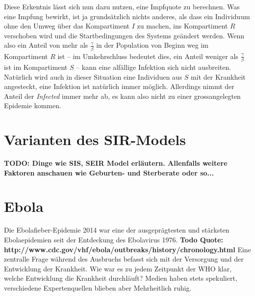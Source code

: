 \begin{refsection}
Diese Erkentnis lässt sich nun dazu nutzen, eine Impfquote zu berechnen. 
Was eine Impfung bewirkt, ist ja grundsätzlich nichts anderes, als dass ein Individuum ohne den Umweg über das Kompartiment $I$ zu machen, ins Kompartiment $R$ verschoben wird und die Startbedingungen des Systems geändert werden.
Wenn also ein Anteil von mehr als $\frac{\gamma}{\beta}$ in der Population von Beginn weg im Kompartiment $R$ ist -- im Umkehrschluss bedeutet dies, ein Anteil weniger als $\frac{\gamma}{\beta}$ ist im Kompartiment $S$ -- kann eine alfällige Infektion sich nicht ausbreiten.
Natürlich wird auch in dieser Situation eine Individuen aus $S$ mit der Krankheit angesteckt, eine Infektion ist natürlich immer möglich. 
Allerdings nimmt der Anteil der \emph{Infected} immer mehr ab, es kann also nicht zu einer grossangelegten Epidemie kommen.

\section{Varianten des SIR-Models}

\textbf{TODO: Dinge wie SIS, SEIR Model erläutern. Allenfalls weitere Faktoren anschauen wie Geburten- und Sterberate oder so...}

\section{Ebola}
Die Ebolafieber-Epidemie 2014  war eine der ausgeprägtesten und stärksten Ebolaepidemien seit der Entdeckung des Ebolavirus 1976. \textbf{Todo Quote: http://www.cdc.gov/vhf/ebola/outbreaks/history/chronology.html} Eine zentralle Frage während des Ausbruchs befasst sich mit der Versorgung und der Entwicklung der Krankheit. Wie war es zu jedem Zeitpunkt der WHO klar, welche Entwicklung die Krankheit durchläuft? Medien haben stets spekuliert, verschiedene Expertenquellen blieben aber Mehrheitlich ruhig. \\


\end{refsection}
